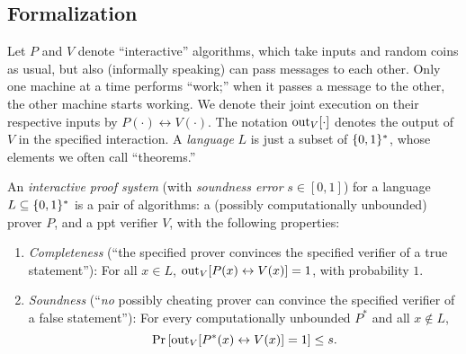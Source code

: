 \documentclass[11pt]{article}
\begin{document}
\subsection{Formalization}
\label{sec:formalization}

Let $P$ and $V$ denote ``interactive'' algorithms, which take inputs
and random coins as usual, but also (informally speaking) can pass
messages to each other.  Only one machine at a time performs ``work;''
when it passes a message to the other, the other machine starts
working.  We denote their joint execution on their respective inputs
by $P(\cdot) \leftrightarrow V(\cdot)$.  The notation
$\text{out}_{V}[\cdot]$ denotes the output of $V$ in the specified
interaction.  A \emph{language} $L$ is just a subset of $\{0,1\}^{*}$,
whose elements we often call ``theorems.''

\begin{definition}
  \label{def:ips}
  An \emph{interactive proof system} (with \emph{soundness error} $s
  \in [0,1]$) for a language $L \subseteq \{0,1\}^{*}$ is a pair of
  algorithms: a (possibly computationally unbounded) prover $P$, and a
  ppt verifier $V$, with the following properties:
  \begin{enumerate}
  \item \emph{Completeness} (``the specified prover convinces the
    specified verifier of a true statement''): For all $x \in L$,
    $\text{out}_{V}[ P(x) \leftrightarrow V(x) ] = 1$, with probability $1$.
  \item \emph{Soundness} (``\emph{no} possibly cheating prover can
    convince the specified verifier of a false statement''): For every
    computationally unbounded $P^*$ and all $x \not\in L$,
    \[ \Pr\left[ \text{out}_{V}[ P^{*}(x) \leftrightarrow V(x) ] = 1 \right]
    \leq s. \]
  \end{enumerate}
\end{definition}
\end{document}
